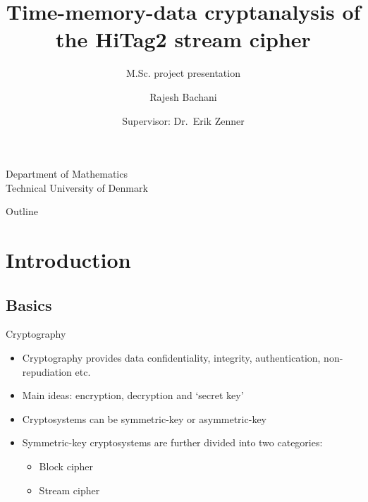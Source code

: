 \documentclass{beamer}
\begin{document}
\title{Time-memory-data cryptanalysis of the HiTag2 stream cipher}
\subtitle{M.Sc. project presentation}

\author{Rajesh Bachani}

\institute
{
  Department of Mathematics\\
  Technical University of Denmark
}

\date
{
	Supervisor: Dr.~Erik Zenner
}

\begin{frame}
  \titlepage
\end{frame}

\begin{frame}{Outline}
  \tableofcontents
\end{frame}

\section{Introduction}

\subsection{Basics}

\begin{frame}{Cryptography}

  \begin{itemize}
  \item Cryptography provides data confidentiality, integrity, authentication, non-repudiation etc. 
  \item Main ideas: encryption, decryption and `secret key'
  \item Cryptosystems can be symmetric-key or asymmetric-key
  \item Symmetric-key cryptosystems are further divided into two categories: 
  	\begin{itemize}
  		\item Block cipher
  		\item Stream cipher
  	\end{itemize}
  \end{itemize}
\end{frame}
\end{document}
